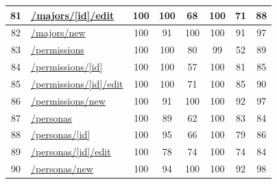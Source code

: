\begin{longtable}{|c|p{5cm}|c|c|c|c|c|c|}
      \hline
      81                                       & \url{/majors/[id]/edit}                                    & 100              & 100              & 68               & 100              & 71               & 88            \\
      \hline
      82                                       & \url{/majors/new}                                          & 100              & 91               & 100              & 100              & 91               & 97            \\
      \hline
      83                                       & \url{/permissions}                                         & 100              & 100              & 80               & 99               & 52               & 89            \\
      \hline
      84                                       & \url{/permissions/[id]}                                    & 100              & 100              & 57               & 100              & 81               & 85            \\
      \hline
      85                                       & \url{/permissions/[id]/edit}                               & 100              & 100              & 71               & 100              & 85               & 90            \\
      \hline
      86                                       & \url{/permissions/new}                                     & 100              & 91               & 100              & 100              & 92               & 97            \\
      \hline
      87                                       & \url{/personas}                                            & 100              & 89               & 62               & 100              & 83               & 84            \\
      \hline
      88                                       & \url{/personas/[id]}                                       & 100              & 95               & 66               & 100              & 79               & 86            \\
      \hline
      89                                       & \url{/personas/[id]/edit}                                  & 100              & 78               & 74               & 100              & 74               & 84            \\
      \hline
      90                                       & \url{/personas/new}                                        & 100              & 94               & 100              & 100              & 92               & 98            \\

\end{longtable}
